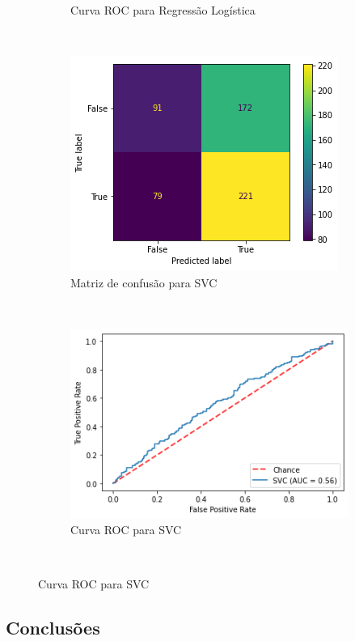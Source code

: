 \begin{figure}[htb]
\begin{subfigure}[b]{0.45\textwidth}
        \caption{Curva ROC para Regressão Logística}
        \label{fig:resultados:base-de-dados-28.3.8-roc-curve-logregression-total-cnae}
    \end{subfigure} ~ \\
    \begin{subfigure}[b]{0.45\textwidth}
        \includegraphics[scale=0.55]{images/base-de-dados-28.4.3-confusion-matrix-svc-total-cnae.png}
        \caption{Matriz de confusão para SVC}
        \label{fig:resultados:base-de-dados-28.3.3-confusion-matrix-svc-total-cnae}
    \end{subfigure} ~ \quad
    \begin{subfigure}[b]{0.45\textwidth}
        \includegraphics[scale=0.55]{images/base-de-dados-28.4.4-roc-curve-svc-total-cnae.png}
        \caption{Curva ROC para SVC}
        \label{fig:resultados:base-de-dados-28.3.4-roc-curve-svc-total-cnae}
    \end{subfigure} ~ \\
    \fdadospesquisa
\end{figure}

\subsection{Conclusões}
\label{section:deteccao-impacto:conclusoes}


